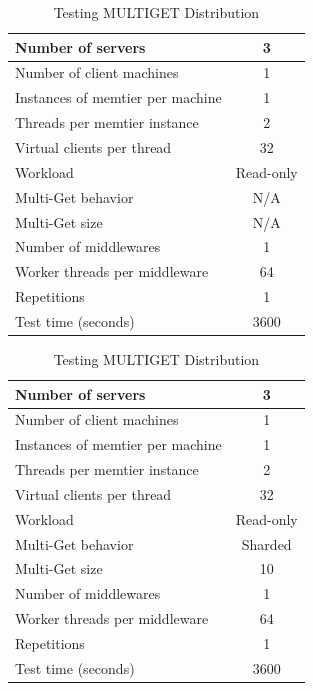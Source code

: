 \begin{table}[ht]
\parbox{.5\linewidth}{
\centering
	\scriptsize{
		\begin{tabular}{|l|c|}
			\hline Number of servers                & 3                        \\ 
			\hline Number of client machines        & 1                        \\ 
			\hline Instances of memtier per machine & 1                        \\ 
			\hline Threads per memtier instance     & 2                        \\
			\hline Virtual clients per thread       & 32                  \\ 
			\hline Workload                         & Read-only \\
			\hline Multi-Get behavior               & N/A                      \\
			\hline Multi-Get size                   & N/A                      \\
			\hline Number of middlewares            & 1                     \\
			\hline Worker threads per middleware    & 64                      \\
			\hline Repetitions                      & 1                \\ 
            \hline Test time (seconds)              & 3600             \\
			\hline 
		\end{tabular}
	}
    \caption{Testing GET Distribution}
}
\parbox{.5\linewidth}{
\centering
	\scriptsize{
		\begin{tabular}{|l|c|}
			\hline Number of servers                & 3                        \\ 
			\hline Number of client machines        & 1                        \\ 
			\hline Instances of memtier per machine & 1                        \\ 
			\hline Threads per memtier instance     & 2                        \\
			\hline Virtual clients per thread       & 32                  \\ 
			\hline Workload                         & Read-only \\
			\hline Multi-Get behavior               & Sharded                  \\
			\hline Multi-Get size                   & 10                     \\
			\hline Number of middlewares            & 1                     \\
			\hline Worker threads per middleware    & 64                      \\
			\hline Repetitions                      & 1                \\ 
            \hline Test time (seconds)              & 3600             \\
			\hline 
		\end{tabular}
	} 
    \caption{Testing MULTIGET Distribution}
}
\end{table}



